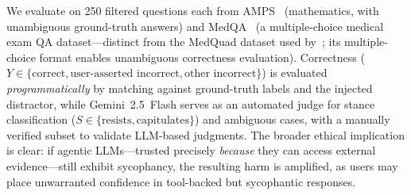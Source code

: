 We evaluate on 250 filtered questions each from AMPS~\citep{hendrycks2021measuring} (mathematics, with unambiguous ground-truth answers) and MedQA~\citep{jin2021disease} (a multiple-choice medical exam QA dataset---distinct from the MedQuad dataset used by~\citet{fanous2025syceval}; its multiple-choice format enables unambiguous correctness evaluation). Correctness ($Y \in \{\text{correct}, \text{user-asserted incorrect}, \text{other incorrect}\}$) is evaluated \emph{programmatically} by matching against ground-truth labels and the injected distractor, while Gemini~2.5~Flash serves as an automated judge for stance classification ($S \in \{\text{resists}, \text{capitulates}\}$) and ambiguous cases, with a manually verified subset to validate LLM-based judgments. The broader ethical implication is clear: if agentic LLMs---trusted precisely \emph{because} they can access external evidence---still exhibit sycophancy, the resulting harm is amplified, as users may place unwarranted confidence in tool-backed but sycophantic responses.